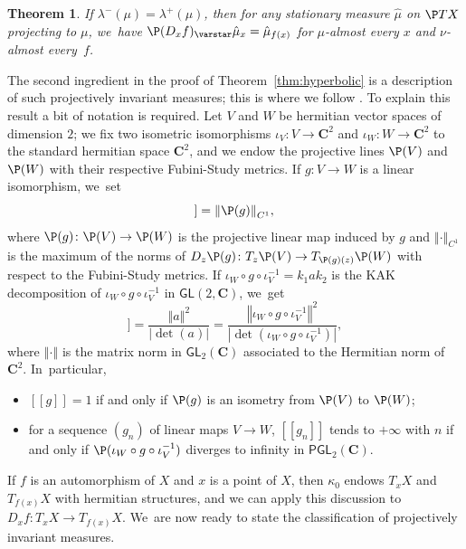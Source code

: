 \documentclass[JEP,XML,SOM,Unicode,published]{cedram}
\newcommand{\llbracket}{[\![}
\newcommand{\rrbracket}{]\!]}
\newcommand{\norm}[1]{{\left\Vert#1\right\Vert}}
\newcommand{\abs}[1]{\left\vert#1\right\vert}
\def\C{\mathbf{C}}
\newcommand\PGL{{\mathsf{PGL}}}
\newcommand\GL{{\mathsf{GL}}}
\theoremstyle{plain}
\newtheorem{thm}{Theorem}[section]
\theoremstyle{definition}
\begin{document}
\begin{thm}\label{thm:ledrappier_invariance_principle}
If $\lambda^{-}(\mu) = \lambda^{+}(\mu)$, then for any stationary measure $\hat \mu$ on $\P TX$ projecting to $\mu$, we~have $\P(D_xf)_\varstar \hat\mu_x = \hat\mu_{f(x)}$
for $\mu$-almost every $x$ and $\nu$-almost every~$f$.
\end{thm}

The second ingredient in the proof of Theorem~\ref{thm:hyperbolic} is
a description of such projectively invariant measures; this is where we follow \cite{barrientos-malicet}.
To explain this result a bit of notation is required. Let $V$ and $W$ be hermitian vector spaces of dimension $2$;
we fix two isometric isomorphisms $\iota_V\colon V\to \C^2$ and $\iota_W\colon W\to \C^2$ to the standard
hermitian space $\C^2$, and we endow the projective lines $\P(V)$ and $\P(W)$ with their respective Fubini-Study metrics. If $g\colon V\to W$
is a linear isomorphism, we~set
\begin{equation*}
\llbracket g \rrbracket= \norm{ \P (g) }_{C^1},
\end{equation*}
where $\P(g) \colon \P(V)\to \P(W)$
is the projective linear map induced by $g$ and $\norm{\cdot}_{C^1}$
is the maximum of the norms of $D_z\P(g) \colon T_z\P(V)\to T_{\P (g)(z)}\P(W)$ with respect to the Fubini-Study metrics.
If $\iota_W\circ g\circ \iota_V^{-1} = k_1ak_2$ is the KAK decomposition of
$\iota_W\circ g\circ \iota_V^{-1}$ in $\GL(2, \C)$, we~get
\begin{equation*}
\llbracket g \rrbracket = \frac{\norm{a}^2}{\abs{\det(a)}} = \frac{\norm{\iota_W\circ g\circ \iota_V^{-1}}^2}{\abs{\det(\iota_W\circ g\circ \iota_V^{-1})}},
\end{equation*}
where
$\norm{\cdot}$ is the matrix norm in $\GL_2(\C)$ associated to the Hermitian norm of $\C^2$. In~particular,
\begin{itemize}
\item[(a)] $\llbracket g \rrbracket=1$ if and only if $\P (g)$ is an isometry from $\P(V)$ to $\P(W)$;
\item[(b)] for a sequence $(g_n)$ of linear maps $V\to W$,
$\llbracket g_n\rrbracket$ tends to $+\infty$ with $n$ if and only if $\P(\iota_W\circ g\circ \iota_V^{-1})$
diverges to infinity in $\PGL_2(\C)$.
\end{itemize}
If $f$ is an automorphism of $X$ and $x$ is a point of $X$, then $\kappa_0$ endows $T_xX$ and $T_{f(x)}X$ with
hermitian structures, and we can apply this discussion to $D_xf\colon T_xX\to T_{f(x)}X$. We~are now ready to state the classification of projectively invariant measures.
\end{document}
